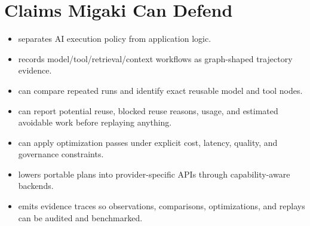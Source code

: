 \section{Claims Migaki Can Defend}

\begin{itemize}[leftmargin=1.5em]
  \item \migaki{} separates AI execution policy from application logic.
  \item \migaki{} records model/tool/retrieval/context workflows as graph-shaped trajectory evidence.
  \item \migaki{} can compare repeated runs and identify exact reusable model and tool nodes.
  \item \migaki{} can report potential reuse, blocked reuse reasons, usage, and estimated avoidable work before replaying anything.
  \item \migaki{} can apply optimization passes under explicit cost, latency, quality, and governance constraints.
  \item \migaki{} lowers portable plans into provider-specific APIs through capability-aware backends.
  \item \migaki{} emits evidence traces so observations, comparisons, optimizations, and replays can be audited and benchmarked.
\end{itemize}
